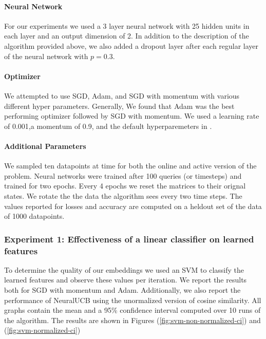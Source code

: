\documentclass{article}
\begin{document}
\paragraph{Neural Network}
For our experiments we used a 3 layer neural network with 25 hidden units in each layer and an output dimension of 2.
In addition to the description of the algorithm provided above, we also added a dropout layer after each regular layer of the neural network with
$p =0.3$.

\paragraph{Optimizer}
We attempted to use SGD, Adam, and SGD with momentum with various different hyper parameters.
Generally, We found that Adam was the best performing optimizer followed by SGD with momentum.
We used a learning rate of 0.001,a momentum of 0.9, and the default hyperparemeters in \cite{adam}.

\paragraph{Additional Parameters}
We sampled ten datapoints at time for both the online and active version of the problem. Neural networks were trained after 100 queries (or timesteps)
and trained for two epochs. Every 4 epochs we reset the matrices to their orignal states. We rotate the the data the algorithm sees every two time steps.
The values reported for losses and accuracy are computed on a heldout set of the data of 1000 datapoints.

\subsubsection{Experiment 1: Effectiveness of a linear classifier on learned features}
To determine the quality of our embeddings we used an SVM to classify the learned features and observe these values
per iteration. We report the results both for SGD with momentum and Adam. Additionally, we also report the performance of NeuralUCB
using the unormalized version of cosine similarity. All graphs contain the mean and a 95\% confidence interval
computed over 10 runs of the algorithm. The results are shown in Figures (\ref{fig:svm-non-normalized-ci}) and (\ref{fig:svm-normalized-ci})
\end{document}
